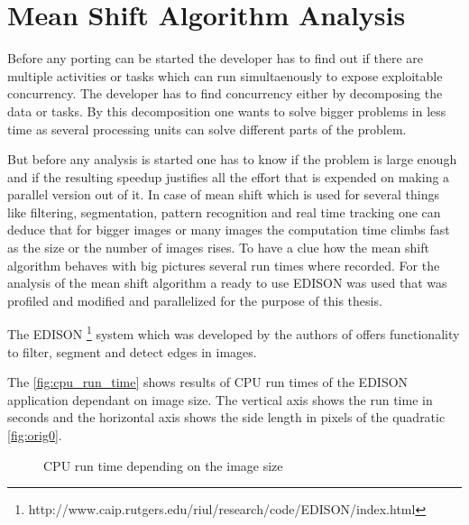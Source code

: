 \chapter{Mean Shift Algorithm Analysis} %
\label{cha:algorithm_analysis}
Before any porting can be started the developer has to find out if there are 
multiple activities or tasks which can run simultaenously to expose exploitable 
concurrency. The developer has to find concurrency either by decomposing the  
data or tasks. By this decomposition one wants to solve bigger problems in less 
time as several processing units can solve different parts of the problem. 

But before any analysis is started one has to know if the problem is large enough
and if the resulting speedup justifies all the effort that is expended on making
a parallel version out of it. In case of mean shift which is used for several 
things like filtering, segmentation, pattern recognition and real time tracking
one can deduce that for bigger images or many images the computation time climbs
fast as the size or the number of images rises. To have a clue how the mean 
shift algorithm behaves with big pictures several run times where recorded.
For the analysis of the mean shift algorithm a ready to use \gls{EDISON} 
was used that was profiled and modified and parallelized for the purpose of this 
thesis.

The
 \gls{EDISON} \footnote{http://www.caip.rutgers.edu/riul/research/code/EDISON/index.html}
system which was developed by the authors  \citeauthor{citeulike:462300} of
\citep{citeulike:462300} offers functionality to filter, segment and detect
edges in images. 

The \autoref{fig:cpu_run_time}
shows results of \gls{CPU} run times of the \gls{EDISON} application dependant
on image size. The vertical axis shows the run time in seconds and the
horizontal axis shows the side length in pixels of the quadratic \autoref{fig:orig0}.



\begin{figure}[ht]
\centering



\caption{CPU run time depending on the image size}
\label{fig:cpu_run_time}
\end{figure}



